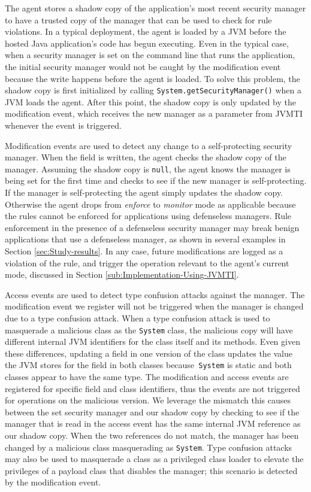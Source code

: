 \documentclass{sig-alternate}
\begin{document}
The agent stores a shadow copy of the application's most recent security
manager to have a trusted copy of the manager that can be used to
check for rule violations. In a typical deployment, the agent is loaded
by a JVM before the hosted Java application's code has begun executing.
Even in the typical case, when a security manager is set on the command
line that runs the application, the initial security manager would
not be caught by the modification event because the write happens
before the agent is loaded. To solve this problem, the shadow copy
is first initialized by calling \texttt{System.getSecurityManager()}
when a JVM loads the agent. After this point, the shadow copy is only
updated by the modification event, which receives the new manager
as a parameter from JVMTI whenever the event is triggered.

Modification events are used to detect any change to a self-protecting
security manager. When the field is written, the agent checks the
shadow copy of the manager. Assuming the shadow copy is \texttt{null},
the agent knows the manager is being set for the first time and checks
to see if the new manager is self-protecting. If the manager is self-protecting
the agent simply updates the shadow copy. Otherwise the agent drops
from \textit{enforce} to \textit{monitor} mode as applicable because
the rules cannot be enforced for applications using defenseless managers.
Rule enforcement in the presence of a defenseless security manager
may break benign applications that use a defenseless manager, as shown
in several examples in Section \ref{sec:Study-results}. In any case,
future modifications are logged as a violation of the rule, and trigger
the operation relevant to the agent's current mode, discussed in Section
\ref{sub:Implementation-Using-JVMTI}.

Access events are used to detect type confusion attacks against the
manager. The modification event we register will not be triggered
when the manager is changed due to a type confusion attack. When a
type confusion attack is used to masquerade a malicious class as the
\texttt{System} class, the malicious copy will have different internal
JVM identifiers for the class itself and its methods. Even given these
differences, updating a field in one version of the class updates
the value the JVM stores for the field in both classes because\texttt{
System} is static and both classes appear to have the same type. The
modification and access events are registered for specific field and
class identifiers, thus the events are not triggered for operations
on the malicious version. We leverage the mismatch this causes between
the set security manager and our shadow copy by checking to see if
the manager that is read in the access event has the same internal
JVM reference as our shadow copy. When the two references do not match,
the manager has been changed by a malicious class masquerading as
\texttt{System}. Type confusion attacks may also be used to masquerade
a class as a privileged class loader to elevate the privileges of
a payload class that disables the manager; this scenario is detected
by the modification event.
\end{document}
